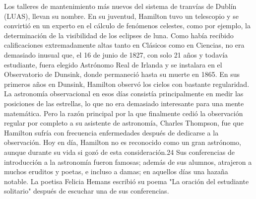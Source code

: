 \begin{parchment}
{Los talleres de mantenimiento más nuevos del sistema de tranvías de Dublín (LUAS), llevan su nombre.
En su juventud, Hamilton tuvo un telescopio y se convirtió en un experto en el cálculo de fenómenos celestes, como por ejemplo, la determinación de la visibilidad de los eclipses de luna. Como había recibido calificaciones extremadamente altas tanto en Clásicos como en Ciencias, no era demasiado inusual que, el 16 de junio de 1827, con solo 21 años y todavía estudiante, fuera elegido Astrónomo Real de Irlanda y se instalara en el Observatorio de Dunsink, donde permaneció hasta su muerte en 1865.
En sus primeros años en Dunsink, Hamilton observó los cielos con bastante regularidad. La astronomía observacional en esos días consistía principalmente en medir las posiciones de las estrellas, lo que no era demasiado interesante para una mente matemática. Pero la razón principal por la que finalmente cedió la observación regular por completo a su asistente de astronomía, Charles Thompson, fue que Hamilton sufría con frecuencia enfermedades después de dedicarse a la observación.
Hoy en día, Hamilton no es reconocido como un gran astrónomo, aunque durante su vida si gozó de esta consideración.24​ Sus conferencias de introducción a la astronomía fueron famosas; además de sus alumnos, atrajeron a muchos eruditos y poetas, e incluso a damas; en aquellos días una hazaña notable. La poetisa Felicia Hemans escribió su poema "La oración del estudiante solitario" después de escuchar una de sus conferencias.}
\end{parchment}



